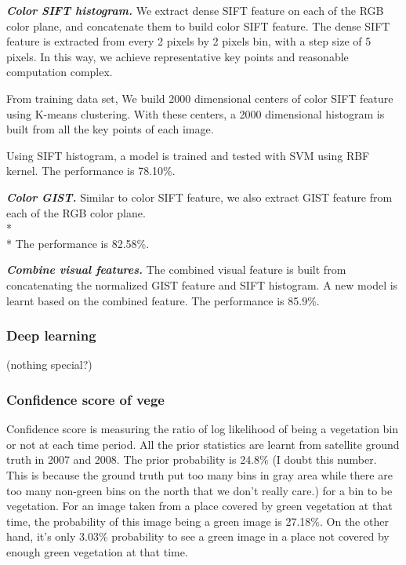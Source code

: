 \textbf{\textit{Color SIFT histogram.}}
We extract dense SIFT feature on each of the RGB color plane, and concatenate them to build color SIFT feature. The dense SIFT feature is extracted from every 2 pixels by 2 pixels bin, with a step size of 5 pixels. In this way, we achieve representative key points and reasonable computation complex. 

From training data set, We build 2000 dimensional centers of color SIFT feature using K-means clustering. With these centers, a 2000 dimensional histogram is built from all the key points of each image.

Using SIFT histogram, a model is trained and tested with SVM using RBF kernel. 
The performance is 78.10\%.

\textbf{\textit{Color GIST.}}
Similar to color SIFT feature, we also extract GIST feature from each of the RGB color plane.\\*\\*
The performance is 82.58\%.

\textbf{\textit{Combine visual features.}}
The combined visual feature is built from concatenating the normalized GIST feature and SIFT histogram. A new model is learnt based on the combined feature.
The performance is 85.9\%.

\subsubsection*{Deep learning}
(nothing special?)




\subsubsection*{Confidence score of vege}
Confidence score is
measuring the ratio of log likelihood of being a vegetation bin or not at each time period. All the prior statistics are learnt from satellite ground truth in 2007 and 2008.
The prior probability is 24.8\% (I doubt this number. This is because the ground truth put too many bins in gray area while there are too many non-green bins on the north that we don't really care.) for a bin to be vegetation.
For an image taken from a place covered by green vegetation at that time, the probability of this image being a green image is 27.18\%. On the other hand, it's only 3.03\% probability to see a green image in a place not covered by enough green vegetation at that time.



